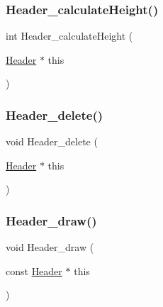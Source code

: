 \subsubsection{\texorpdfstring{Header\+\_\+calculate\+Height()}{Header\_calculateHeight()}}
{\footnotesize\ttfamily int Header\+\_\+calculate\+Height (\begin{DoxyParamCaption}\item[{\hyperlink{linux_2download_2htop-3_83_80_2Header_8h_a7f4dfcf80c34406946a7bda3d88d5e36}{Header} $\ast$}]{this }\end{DoxyParamCaption})}

\mbox{\label{linux_2download_2htop-3_83_80_2Header_8h_aa6c5ee017dcbc2559b8043d13c6ce4ee}} 
\subsubsection{\texorpdfstring{Header\+\_\+delete()}{Header\_delete()}}
{\footnotesize\ttfamily void Header\+\_\+delete (\begin{DoxyParamCaption}\item[{\hyperlink{linux_2download_2htop-3_83_80_2Header_8h_a7f4dfcf80c34406946a7bda3d88d5e36}{Header} $\ast$}]{this }\end{DoxyParamCaption})}

\mbox{\label{linux_2download_2htop-3_83_80_2Header_8h_a8fdc16efdbdf77c599e2286925876790}} 
\subsubsection{\texorpdfstring{Header\+\_\+draw()}{Header\_draw()}}
{\footnotesize\ttfamily void Header\+\_\+draw (\begin{DoxyParamCaption}\item[{const \hyperlink{linux_2download_2htop-3_83_80_2Header_8h_a7f4dfcf80c34406946a7bda3d88d5e36}{Header} $\ast$}]{this }\end{DoxyParamCaption})}


